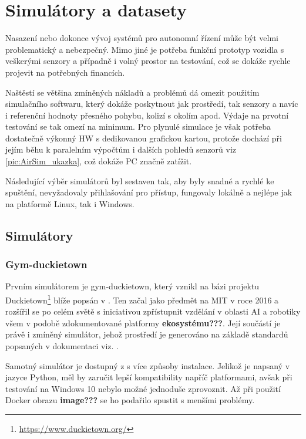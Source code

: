 \documentclass[czech, bc, kky, he, iso690numb]{fasthesis}
\begin{document}
    \chapter{Simulátory a datasety}
    	Nasazení nebo dokonce vývoj systémů pro autonomní řízení může být velmi problematický a nebezpečný. Mimo jiné je potřeba funkční prototyp vozidla s veškerými senzory a případně i volný prostor na testování, což se dokáže rychle projevit na potřebných financích.
    	
    	Naštěstí se většina zmíněných nákladů a problémů dá omezit použitím simulačního softwaru, který dokáže poskytnout jak prostředí, tak senzory a navíc i referenční hodnoty přesného pohybu, kolizí s okolím apod. Výdaje na prvotní testování se tak omezí na minimum. Pro plynulé simulace je však potřeba dostatečně výkonný HW s dedikovanou grafickou kartou, protože dochází při jejím běhu k paralelním výpočtům i dalších pohledů senzorů viz \ref{pic:AirSim_ukazka}, což dokáže PC značně zatížit.
    	
    	Následující výběr simulátorů byl sestaven tak, aby byly snadné a rychlé ke spuštění, nevyžadovaly přihlašování pro přístup, fungovaly lokálně a nejlépe jak na platformě Linux, tak i Windows.
    	\section{Simulátory}
    		\subsection{Gym-duckietown}
    			Prvním simulátorem je gym-duckietown, který vznikl na bázi projektu Duckietown\footnote{\href{https://www.duckietown.org/}{https://www.duckietown.org/}} blíže popsán v \cite{Duckietown}. Ten začal jako předmět na MIT v roce 2016 a rozšířil se po celém světě s iniciativou zpřístupnit vzdělání v oblasti AI a robotiky všem v podobě zdokumentované platformy \textbf{ekosystému???}. Její součástí je právě i zmíněný simulátor, jehož prostředí je generováno na základě standardů popsaných v dokumentaci viz. \cite{duckietown_documentation}.
    			
    			Samotný simulátor je dostupný z \cite{gym_duckietown} s více způsoby instalace. Jelikož je napsaný v jazyce Python, měl by zaručit lepší kompatibility napříč platformami, avšak při testování na Windows 10 nebylo možné jednoduše zprovoznit. Až při použití Docker obrazu \textbf{image???} se ho podařilo spustit s menšími problémy.
    			
\end{document}
